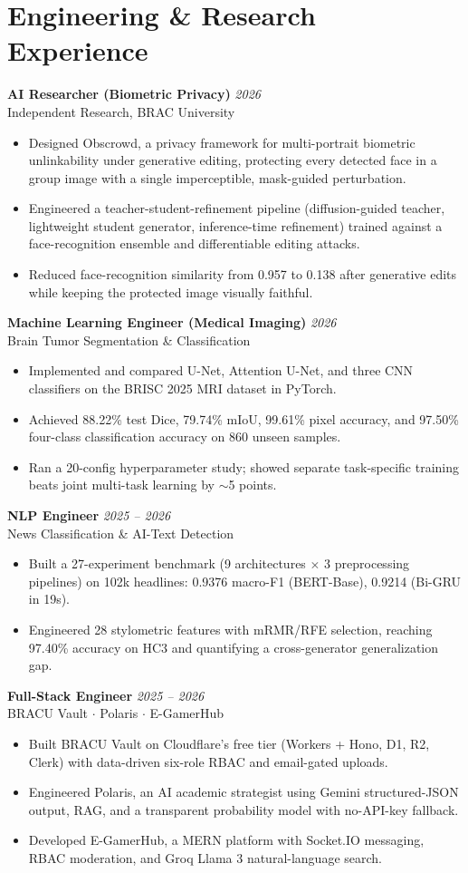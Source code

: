 \documentclass[11pt,a4paper]{article}
\newcommand{\entry}[3]{\textbf{#1} \hfill \textit{#3}\\[-0.2em]{\color{accent}#2}\\[0.2em]}
\begin{document}
\section{Engineering \& Research Experience}
\entry{AI Researcher (Biometric Privacy)}{Independent Research, BRAC University}{2026}
\begin{itemize}
  \item Designed Obscrowd, a privacy framework for multi-portrait biometric unlinkability under generative editing, protecting every detected face in a group image with a single imperceptible, mask-guided perturbation.
  \item Engineered a teacher-student-refinement pipeline (diffusion-guided teacher, lightweight student generator, inference-time refinement) trained against a face-recognition ensemble and differentiable editing attacks.
  \item Reduced face-recognition similarity from 0.957 to 0.138 after generative edits while keeping the protected image visually faithful.
\end{itemize}

\entry{Machine Learning Engineer (Medical Imaging)}{Brain Tumor Segmentation \& Classification}{2026}
\begin{itemize}
  \item Implemented and compared U-Net, Attention U-Net, and three CNN classifiers on the BRISC 2025 MRI dataset in PyTorch.
  \item Achieved 88.22\% test Dice, 79.74\% mIoU, 99.61\% pixel accuracy, and 97.50\% four-class classification accuracy on 860 unseen samples.
  \item Ran a 20-config hyperparameter study; showed separate task-specific training beats joint multi-task learning by $\sim$5 points.
\end{itemize}

\entry{NLP Engineer}{News Classification \& AI-Text Detection}{2025 -- 2026}
\begin{itemize}
  \item Built a 27-experiment benchmark (9 architectures $\times$ 3 preprocessing pipelines) on 102k headlines: 0.9376 macro-F1 (BERT-Base), 0.9214 (Bi-GRU in 19s).
  \item Engineered 28 stylometric features with mRMR/RFE selection, reaching 97.40\% accuracy on HC3 and quantifying a cross-generator generalization gap.
\end{itemize}

\entry{Full-Stack Engineer}{BRACU Vault $\cdot$ Polaris $\cdot$ E-GamerHub}{2025 -- 2026}
\begin{itemize}
  \item Built BRACU Vault on Cloudflare's free tier (Workers + Hono, D1, R2, Clerk) with data-driven six-role RBAC and email-gated uploads.
  \item Engineered Polaris, an AI academic strategist using Gemini structured-JSON output, RAG, and a transparent probability model with no-API-key fallback.
  \item Developed E-GamerHub, a MERN platform with Socket.IO messaging, RBAC moderation, and Groq Llama 3 natural-language search.
\end{itemize}
\end{document}
